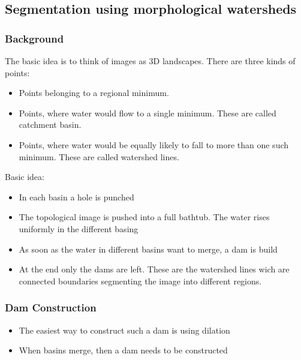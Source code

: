 \subsection{Segmentation using morphological watersheds}
\subsubsection{Background}
The basic idea is to think of images as 3D landscapes. There are three kinds of points:
\begin{itemize}
\item Points belonging to a regional minimum.
\item Points, where water would flow to a single minimum. These are called catchment basin.
\item Points, where water would be equally likely to fall to more than one such minimum. These are called watershed lines.
\end{itemize}
Basic idea:
\begin{itemize}
\item In each basin a hole is punched
\item The topological image is pushed into a full bathtub. The water rises uniformly in the different basing
\item As soon as the water in different basins want to merge, a dam is build
\item At the end only the dams are left. These are the watershed lines wich are connected boundaries segmenting the image into different regions.
\end{itemize}
\subsubsection{Dam Construction}
\begin{itemize}
\item The easiest way to construct such a dam is using dilation
\item When basins merge, then a dam needs to be constructed
\end{itemize}
